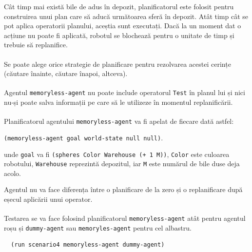 \documentclass[12pt]{article}
\newcommand{\repr}[1]{{\color{sapphire}\texttt{#1}}}
\begin{document}
Cât timp mai există bile de adus în depozit, planificatorul este
folosit pentru construirea unui plan care să aducă următoarea sferă în
depozit. Atât timp cât se pot aplica operatorii planului, aceștia sunt
executați. Dacă la un moment dat o acțiune nu poate fi aplicată,
robotul se blochează pentru o unitate de timp și trebuie să
replanifice.

\paragraph{}

Se poate alege orice strategie de planificare pentru rezolvarea
acestei cerințe (căutare înainte, căutare înapoi, altceva).

\paragraph{}

Agentul \repr{memoryless-agent} nu poate include operatorul
\repr{Test} în planul lui și nici nu-și poate salva informații pe
care să le utilizeze în momentul replanificării.

\paragraph{}

Planificatorul agentului \repr{memoryless-agent} va fi apelat de
fiecare dată astfel:
\begin{center}
  \repr{(memoryless-agent goal world-state null null)}.
\end{center}
unde \repr{goal} va fi \repr{(spheres Color Warehouse (+ 1 M))},
\repr{Color} este culoarea robotului, \repr{Warehouse} reprezintă
depozitul, iar \repr{M} este numărul de bile duse deja acolo.

Agentul nu va face diferența între o planificare de la zero și o
replanificare după eșecul aplicării unui operator.

\paragraph{}

Testarea se va face folosind planificatorul \repr{memoryless-agent}
atât pentru agentul roșu și \repr{dummy-agent} sau
\repr{memoryles-agent} pentru cel albastru.

\begin{verbatim}
  (run scenario4 memoryless-agent dummy-agent)
\end{verbatim}
\end{document}
